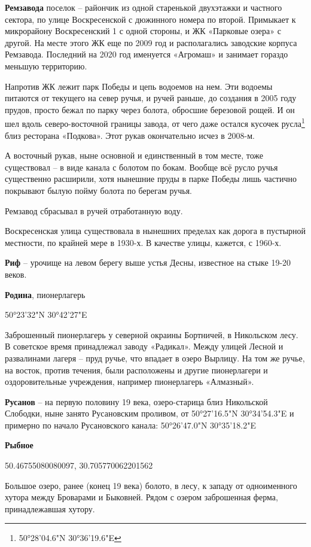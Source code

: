 \newpage

\textbf{Ремзавода} поселок – райончик из одной старенькой двухэтажки и частного сектора, по улице Воскресенской с дюжинного номера по второй. Примыкает к микрорайону Воскресенский 1 с одной стороны, и ЖК «Парковые озера» с другой. На месте этого ЖК еще по 2009 год и располагались заводские корпуса Ремзавода. Последний на 2020 год именуется «Агромаш» и занимает гораздо меньшую территорию.

Напротив ЖК лежит парк Победы и цепь водоемов на нем. Эти водоемы питаются от текущего на север ручья, и ручей раньше, до создания в 2005 году прудов, просто бежал по парку через болота, обросшие березовой рощей. И он шел вдоль северо-восточной границы завода, от чего даже остался кусочек русла\footnote{50°28'04.6"N 30°36'19.6"E} близ ресторана «Подкова». Этот рукав окончательно исчез в 2008-м. 

А восточный рукав, ныне основной и единственный в том месте, тоже существовал – в виде канала с болотом по бокам. Вообще всё русло ручья существенно расширили, хотя нынешние пруды в парке Победы лишь частично покрывают былую пойму болота по берегам ручья.

Ремзавод сбрасывал в ручей отработанную воду.

Воскресенская улица существовала в нынешних пределах как дорога в пустырной местности, по крайней мере в 1930-х. В качестве улицы, кажется,  с 1960-х.\\

\medskip

\textbf{Риф} – урочище на левом берегу выше устья Десны, известное на стыке 19-20 веков.\\

\medskip

\textbf{Родина}, пионерлагерь

50°23'32"N 30°42'27"E

Заброшенный пионерлагерь у северной окраины Бортничей, в Никольском лесу. В советское время принадлежал заводу «Радикал». Между улицей Лесной и развалинами лагеря – пруд ручье, что впадает в озеро Вырлицу. На том же ручье, на восток, против течения, были расположены и другие пионерлагери и оздоровительные учреждения, например пионерлагерь «Алмазный».\\

\medskip


\textbf{Русанов} – на первую половину 19 века, озеро-старица близ Никольской Слободки, ныне занято Русановским проливом, от 50°27'16.5"N 30°34'54.3"E и примерно по начало Русановского канала: 50°26'47.0"N 30°35'18.2"E\\

\medskip

\textbf{Рыбное} 

50.46755080080097, 30.705770062201562

Большое озеро, ранее (конец 19 века) болото, в лесу, к западу от одноименного хутора между Броварами и Быковней. Рядом с озером заброшенная ферма, принадлежавшая хутору.
